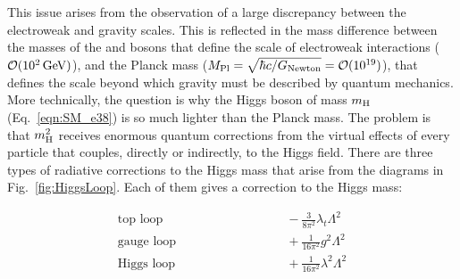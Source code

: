 This issue arises from the observation of a large discrepancy between the electroweak and gravity scales. This is reflected in the mass difference between the masses of the \PW and \PZ bosons that define the scale of electroweak interactions ($\mathcal{O}(10^2\,\text{Ge\hspace{-.08em}V})$), and the Planck mass ($M_\mathrm{Pl} = \sqrt{\hbar c/G_\mathrm{Newton}} = \mathcal{O}(10^{19})$), that defines the scale beyond which gravity must be described by quantum mechanics.
More technically, the question is why the Higgs boson of mass $m_\mathrm{H}$ (Eq.~\ref{eqn:SM_e38}) is so much lighter than the Planck mass.
The problem is that $m^2_\mathrm{H}$ receives enormous quantum corrections from the virtual effects of every particle that couples, directly or indirectly, to the Higgs field.
There are three types of radiative corrections to the Higgs mass that arise from the diagrams in Fig.~\ref{fig:HiggsLoop}.
Each of them gives a correction to the Higgs mass:

\begin{equation}\label{eqn:HiggsCorr}
\begin{aligned}
\mbox{top loop} & \qquad\qquad\qquad\qquad -\frac{3}{8\pi^2}\lambda_t\Lambda^2\\
\mbox{gauge loop} & \qquad\qquad\qquad\qquad + \frac{1}{16\pi^2}g^2\Lambda^2\\
\mbox{Higgs loop} & \qquad\qquad\qquad\qquad + \frac{1}{16\pi^2}\lambda^2\Lambda^2\\
\end{aligned}
\end{equation}

